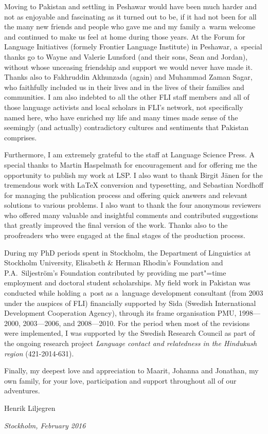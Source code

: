 \begin{refsection}
Moving to Pakistan and settling in Peshawar would have been much harder and not as enjoyable and fascinating as it turned out to be, if it had not been for all the many new friends and people who gave me and my family a~warm welcome and continued to make us feel at home during those years. At the Forum for Language Initiatives (formely Frontier Language Institute) in Peshawar, a~special thanks go to Wayne and Valerie Lunsford (and their sons, Sean and Jordan), without whose unceasing friendship and support we would never have made it. Thanks also to Fakhruddin Akhunzada (again) and Muhammad Zaman Sagar, who faithfully included us in their lives and in the lives of their families and communities. I am also indebted to all the other FLI staff members and all of those language activists and local scholars in FLI’s network, not specifically named here, who have enriched my life and many times made sense of the seemingly (and actually) contradictory cultures and sentiments that Pakistan comprises.


Furthermore, I am extremely grateful to the staff at Language Science Press. A special thanks to Martin Haspelmath for encouragement and for offering me the opportunity to publish my work at LSP. I also want to thank Birgit Jänen for the tremendous work with LaTeX conversion and typesetting, and Sebastian Nordhoff for managing the publication process and offering quick answers and relevant solutions to various problems. I also want to thank the four anonymous reviewers who offered many valuable and insightful comments and contributed suggestions that greatly improved the final version of the work. Thanks also to the proofreaders who were engaged at the final stages of the production process.


During my PhD periods spent in Stockholm, the Department of Linguistics at Stockholm University, Elisabeth \& Herman Rhodin's Foundation and P.A.~Siljeström's Foundation contributed by providing me part"=time employment and doctoral student scholarships. My field work in Pakistan was conducted while holding a~post as a~language development consultant (from 2003 under the auspices of FLI) financially supported by Sida (Swedish International Development Cooperation Agency), through its frame organisation PMU, 1998—2000, 2003—2006, and 2008—2010. For the period when most of the revisions were implemented, I was supported by the Swedish Research Council as part of the ongoing research project \textit{Language contact and relatedness in the Hindukush region} (421-2014-631).


Finally, my deepest love and appreciation to Maarit, Johanna and Jonathan, my own family, for your love, participation and support throughout all of our adventures.




Henrik Liljegren


\textit{Stockholm, February 2016}


\printbibliography[heading=subbibliography]
\end{refsection}